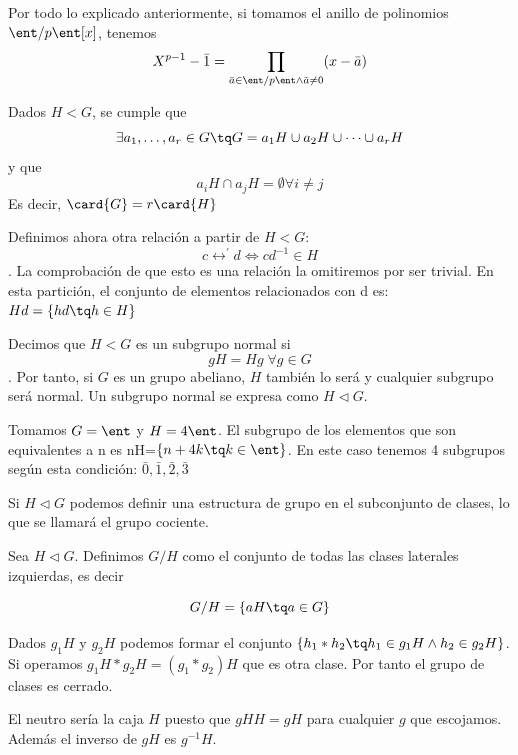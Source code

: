 \documentclass{apuntes}
\begin{document}
  \begin{example}
   Por todo lo explicado anteriormente, si tomamos el anillo de polinomios $\ent/p\ent[x]$, tenemos \[ X^{p-1}-\bar{1}=
   \prod_{\bar{a}\in\ent/p\ent \wedge \bar{a}\neq 0}(x-\bar{a}) \]
  \end{example}
  
  \begin{theorem}
   Dados $H<G$,  se cumple que \[ \exists a_{1},\dotsc,a_{r}\in G\tq G=a_{1}H \cup a_{2}H \cup \dotsb \cup a_{r}H\] y que \[ a_{i}H\cap a_{j}H=\emptyset \forall i\neq j\] 
   Es decir, $\card{G}=r\card{H}$
  \end{theorem}

  Definimos ahora otra relación a partir de $H<G$: \[ c\rel^{'}d \Leftrightarrow cd^{-1}\in H \]. La comprobación de que esto es una relación
  la omitiremos por ser trivial. En esta partición, el conjunto de elementos relacionados con d es: $Hd=\{hd\tq h\in H\}$
  
  \begin{defn}
   Decimos que $H<G$  es un subgrupo normal si \[ gH=Hg \; \forall g \in G \]. Por tanto, si $G$ es un grupo abeliano, $H$ también lo será y cualquier  subgrupo será normal. Un subgrupo normal se expresa como $H\lhd G$.
  \end{defn}
  
  \begin{example}
   Tomamos $G=\ent$  y $H=4\ent$. 
   El subgrupo de los elementos que son equivalentes a n es nH=$\{n+4k\tq k \in \ent\}$.
   En este caso tenemos 4 subgrupos según esta condición: $\bar{0},\bar{1},\bar{2},\bar{3}$
  \end{example}
  
  Si $H\lhd G$  podemos definir una estructura de grupo en el subconjunto de clases, lo que se llamará el grupo cociente.
  
  \begin{defn} Sea $H \lhd G$. Definimos $G / H$ como el conjunto de todas las clases laterales izquierdas, es decir
  
  \[ G/H = \{ aH \tq a \in G\} \]
  \end{defn}
  
  
  Dados $g_{1}H$  y $g_{2}H$  podemos formar el conjunto $\{h_{1}\ast h_{2}\tq h_{1}\in g_{1}H \wedge h_{2}\in g_{2}H\}$. Si operamos   $g_{1}H\ast g_{2}H=(g_{1}\ast g_{2})H$  que es otra clase. Por tanto el grupo de clases es cerrado.
  
  El neutro sería la caja $H$ puesto que $gHH=gH$ para cualquier $g$ que escojamos. Además el inverso de $gH$ es $g^{-1}H$.
  
\end{document}
